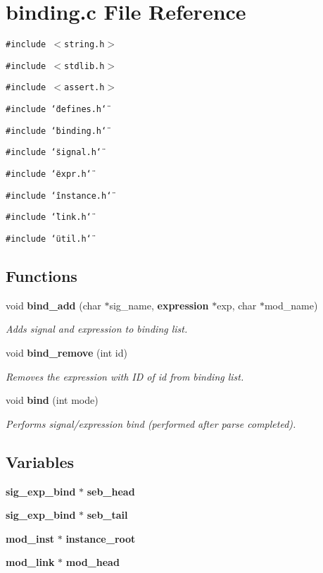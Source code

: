 \section{binding.c File Reference}
\label{binding_8c}
{\tt \#include $<$string.h$>$}\par
{\tt \#include $<$stdlib.h$>$}\par
{\tt \#include $<$assert.h$>$}\par
{\tt \#include \char`\"{}defines.h\char`\"{}}\par
{\tt \#include \char`\"{}binding.h\char`\"{}}\par
{\tt \#include \char`\"{}signal.h\char`\"{}}\par
{\tt \#include \char`\"{}expr.h\char`\"{}}\par
{\tt \#include \char`\"{}instance.h\char`\"{}}\par
{\tt \#include \char`\"{}link.h\char`\"{}}\par
{\tt \#include \char`\"{}util.h\char`\"{}}\par
\subsection*{Functions}
\begin{CompactItemize}
\item 
void {\bf bind\_\-add} (char $\ast$sig\_\-name, {\bf expression} $\ast$exp, char $\ast$mod\_\-name)
\begin{CompactList}\small\item\em Adds signal and expression to binding list.\item\end{CompactList}\item 
void {\bf bind\_\-remove} (int id)
\begin{CompactList}\small\item\em Removes the expression with ID of id from binding list.\item\end{CompactList}\item 
void {\bf bind} (int mode)
\begin{CompactList}\small\item\em Performs signal/expression bind (performed after parse completed).\item\end{CompactList}\end{CompactItemize}
\subsection*{Variables}
\begin{CompactItemize}
\item 
{\bf sig\_\-exp\_\-bind} $\ast$ {\bf seb\_\-head}
\item 
{\bf sig\_\-exp\_\-bind} $\ast$ {\bf seb\_\-tail}
\item 
{\bf mod\_\-inst} $\ast$ {\bf instance\_\-root}
\item 
{\bf mod\_\-link} $\ast$ {\bf mod\_\-head}
\end{CompactItemize}


